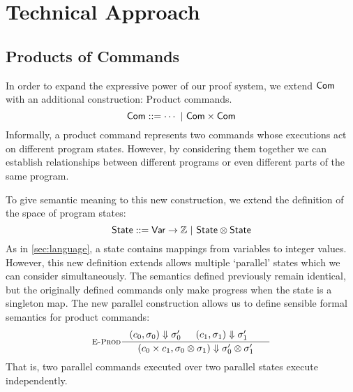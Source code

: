 \documentclass[p.tex]{subfiles}
\begin{document}
\section{Technical Approach}\label{sec:approach}
\subsection{Products of Commands}\label{sec:product-com}
In order to expand the expressive power of our proof system, we extend
$\textsf{Com}$ with an additional construction: Product commands.
\[ \textsf{Com} ::= \cdots~|~\textsf{Com}\times\textsf{Com} \]
Informally,
a product command represents two commands whose executions act on
different program states. However, by considering them together we can
establish relationships between different programs or even different
parts of the same program.

To give semantic meaning to this new construction, we extend the
definition of the space of program states:
\[\textsf{State} ::= \textsf{Var} \rightarrow \mathbb{Z}~|~\textsf{State}\otimes\textsf{State}\]
As in \cref{sec:language}, a state contains mappings from variables to integer
values. However, this new definition extends allows multiple
`parallel' states which we can consider simultaneously. The semantics
defined previously remain identical, but the originally defined
commands only make progress when the state is a singleton map. The new
parallel construction allows us to define sensible formal semantics for
product commands:
\begin{align*}
  \inference[\textsc{E-Prod}]{%
    \ceval{c_0}{\sigma_0}{\sigma_0'}&
    \ceval{c_1}{\sigma_1}{\sigma_1'}&
  }{%
    \ceval{\cprod{c_0}{c_1}}{\sprod{\sigma_0}{\sigma_1}}{\sprod{\sigma_0'}{\sigma_1'}}
  }
\end{align*}
That is, two parallel commands executed over two parallel states
execute independently.
\end{document}
